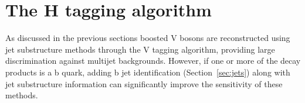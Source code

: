 
\section{The H tagging algorithm}
\label{sec:htagging}

As discussed in the previous sections boosted V bosons are reconstructed using jet substructure methods
through the V tagging algorithm, providing large discrimination against multijet backgrounds.
However, if one or more of the decay products is a b quark, adding b jet identification (Section~\ref{sec:jets}) along
with jet substructure information can significantly improve the sensitivity of these methods.

